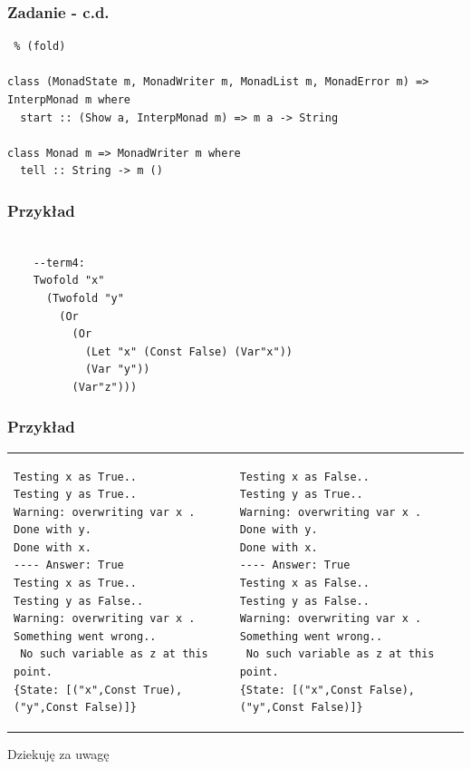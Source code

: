 \documentclass{beamer}
\begin{document}
\begin{frame}[fragile] %
  \frametitle{Zadanie - c.d.}
  \begin{lstlisting} % (fold)

class (MonadState m, MonadWriter m, MonadList m, MonadError m) => InterpMonad m where
  start :: (Show a, InterpMonad m) => m a -> String

class Monad m => MonadWriter m where
  tell :: String -> m ()

  \end{lstlisting}
\end{frame}

\begin{frame}[fragile] %
  \frametitle{Przykład}
  \begin{verbatim}

    --term4:
    Twofold "x" 
      (Twofold "y" 
        (Or 
          (Or 
            (Let "x" (Const False) (Var"x")) 
            (Var "y")) 
          (Var"z")))

\end{verbatim}
\end{frame}

\begin{frame}[fragile] %
  \frametitle{Przykład}
  \tiny{
  \begin{center}
  \begin{tabular}{ p{} | p{}}
    \begin{lstlisting}
Testing x as True..
Testing y as True..
Warning: overwriting var x .
Done with y.
Done with x.
---- Answer: True
Testing x as True..
Testing y as False..
Warning: overwriting var x .
Something went wrong..
 No such variable as z at this point.
{State: [("x",Const True),("y",Const False)]}
     \end{lstlisting}
     &
     \begin{lstlisting}
Testing x as False..
Testing y as True..
Warning: overwriting var x .
Done with y.
Done with x.
---- Answer: True
Testing x as False..
Testing y as False..
Warning: overwriting var x .
Something went wrong..
 No such variable as z at this point.
{State: [("x",Const False),("y",Const False)]}
    \end{lstlisting}
  \end{tabular}
\end{center}
}
\end{frame}

\begin{frame} %
  \begin{center}
    \huge{Dziekuję za uwagę}
  \end{center}
\end{frame}
\end{document}
